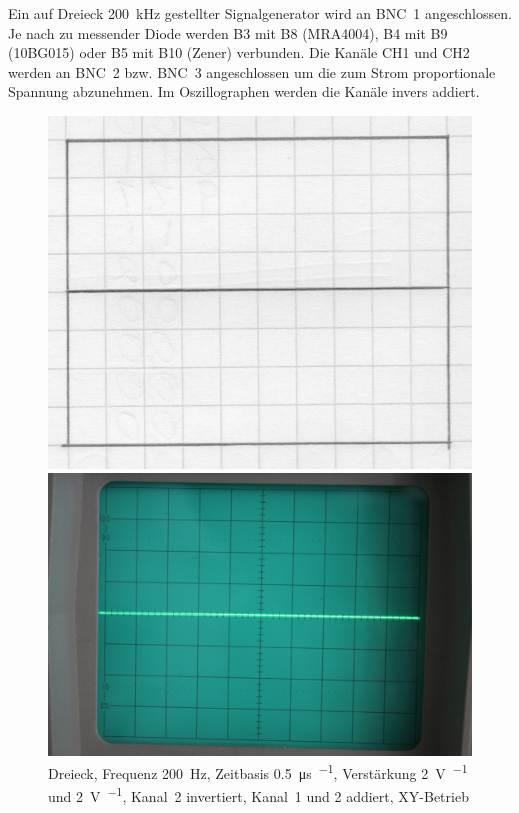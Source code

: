 Ein auf Dreieck \SI{200}{\kilo\hertz} gestellter Signalgenerator wird an BNC~1
angeschlossen. Je nach zu messender Diode werden B3 mit B8 (MRA4004), B4 mit B9
(10BG015) oder B5 mit B10 (Zener) verbunden. Die Kanäle CH1 und CH2 werden an
BNC~2 bzw. BNC~3 angeschlossen um die zum Strom proportionale Spannung
abzunehmen. Im Oszillographen werden die Kanäle invers addiert. 

\begin{figure}[htbp]
	\centering
	\begin{minipage}{.45\linewidth}
	\includegraphics[width=\linewidth]{Oszi_Hand/785.jpg}
	\end{minipage}
	\hfill
	\begin{minipage}{.45\linewidth}
	\includegraphics[width=\linewidth]{Oszi_Foto/785.jpg}
	\end{minipage}
	\caption{%
		Dreieck, Frequenz \SI{200}{\hertz},
		Zeitbasis \SI{.5}{\micro\second\per\division},
		Verstärkung \SI{2}{\volt\per\division} und \SI{2}{\volt\per\division},
		Kanal~2 invertiert, Kanal~1 und 2 addiert, XY-Betrieb
	}
	\label{fig:785}
\end{figure}


